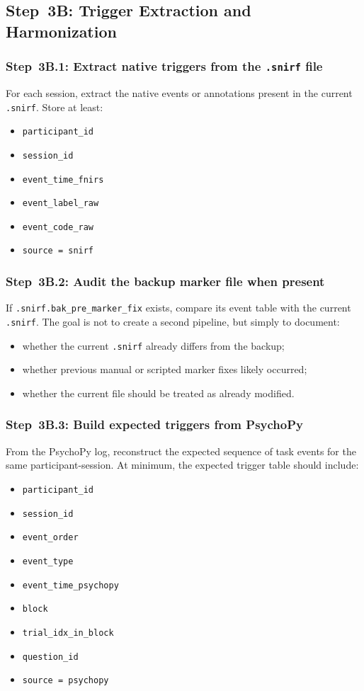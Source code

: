 \subsection{Step~3B: Trigger Extraction and Harmonization}

\subsubsection{Step~3B.1: Extract native triggers from the \texttt{.snirf} file}
For each session, extract the native events or annotations present in the current \texttt{.snirf}.
Store at least:
\begin{itemize}
    \item \texttt{participant\_id}
    \item \texttt{session\_id}
    \item \texttt{event\_time\_fnirs}
    \item \texttt{event\_label\_raw}
    \item \texttt{event\_code\_raw}
    \item \texttt{source = snirf}
\end{itemize}

\subsubsection{Step~3B.2: Audit the backup marker file when present}
If \texttt{.snirf.bak\_pre\_marker\_fix} exists, compare its event table with the current \texttt{.snirf}.
The goal is not to create a second pipeline, but simply to document:
\begin{itemize}
    \item whether the current \texttt{.snirf} already differs from the backup;
    \item whether previous manual or scripted marker fixes likely occurred;
    \item whether the current file should be treated as already modified.
\end{itemize}

\subsubsection{Step~3B.3: Build expected triggers from PsychoPy}
From the PsychoPy log, reconstruct the expected sequence of task events for the same participant-session.
At minimum, the expected trigger table should include:
\begin{itemize}
    \item \texttt{participant\_id}
    \item \texttt{session\_id}
    \item \texttt{event\_order}
    \item \texttt{event\_type}
    \item \texttt{event\_time\_psychopy}
    \item \texttt{block}
    \item \texttt{trial\_idx\_in\_block}
    \item \texttt{question\_id}
    \item \texttt{source = psychopy}
\end{itemize}

